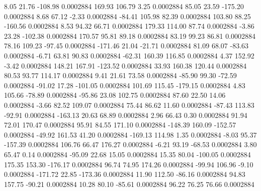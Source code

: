         8.05       21.76     -108.98     0.0002884
      169.93      106.79        3.25     0.0002884
       85.05       23.59     -175.20     0.0002884
        8.68       67.12       -2.33     0.0002884
      -84.41      105.98       82.39     0.0002884
      103.80       88.25     -160.56     0.0002884
        8.53       94.32       66.71     0.0002884
      179.33      114.00       87.74     0.0002884
       -3.86       23.28     -102.38     0.0002884
      170.57       95.81       89.18     0.0002884
       83.19       99.23       86.81     0.0002884
       78.16      109.23      -97.45     0.0002884
     -171.46       21.04      -21.71     0.0002884
       81.09       68.07      -83.63     0.0002884
       -6.71       63.81       90.83     0.0002884
      -62.31      160.39      116.85     0.0002884
        4.37      152.92       -3.42     0.0002884
      148.21      167.91     -123.52     0.0002884
       33.93      160.38      120.44     0.0002884
       80.53       93.77      114.17     0.0002884
        9.41       21.61       73.58     0.0002884
      -85.90       99.30      -72.59     0.0002884
      -91.02       17.28     -101.05     0.0002884
      101.69      115.45     -179.15     0.0002884
        4.83      105.66      -78.89     0.0002884
      -95.86       23.08      102.75     0.0002884
       87.60       22.50       14.06     0.0002884
       -3.66       82.52      109.07     0.0002884
       75.44       86.62       11.60     0.0002884
      -87.43      113.83      -92.91     0.0002884
     -163.13       20.63       68.89     0.0002884
        2.96       66.43        0.30     0.0002884
       91.94       72.01      170.47     0.0002884
       95.91       84.55      171.10     0.0002884
     -148.39      160.09     -152.57     0.0002884
      -49.92      161.53       41.20     0.0002884
     -169.13      114.98        1.35     0.0002884
       -8.03       95.37     -157.39     0.0002884
      106.76       66.47      176.27     0.0002884
       -6.21       93.19      -68.53     0.0002884
        3.80       65.47        0.14     0.0002884
      -95.09       22.68       15.05     0.0002884
       15.35       80.04     -100.05     0.0002884
      175.35      153.30     -176.17     0.0002884
       96.74       74.95      174.26     0.0002884
      -99.94      106.96       -9.10     0.0002884
     -171.72       22.85     -173.36     0.0002884
       11.90      112.50      -86.16     0.0002884
       94.83      157.75      -90.21     0.0002884
       10.28       80.10      -85.61     0.0002884
       96.22       76.25       76.66     0.0002884
